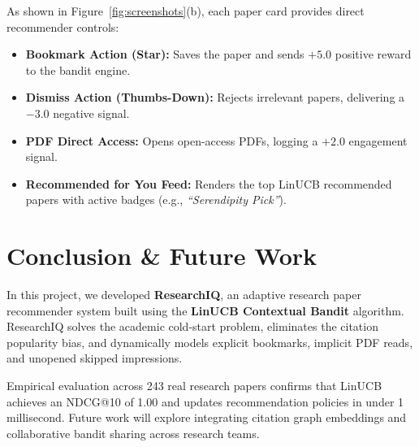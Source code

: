 \documentclass[11pt,a4paper]{article}
\begin{document}
As shown in Figure~\ref{fig:screenshots}(b), each paper card provides direct recommender controls:
\begin{itemize}[leftmargin=1.5em]
    \item \textbf{Bookmark Action (Star):} Saves the paper and sends $+5.0$ positive reward to the bandit engine.
    \item \textbf{Dismiss Action (Thumbs-Down):} Rejects irrelevant papers, delivering a $-3.0$ negative signal.
    \item \textbf{PDF Direct Access:} Opens open-access PDFs, logging a $+2.0$ engagement signal.
    \item \textbf{Recommended for You Feed:} Renders the top LinUCB recommended papers with active badges (e.g., \textit{``Serendipity Pick''}).
\end{itemize}

\section{Conclusion \& Future Work}

In this project, we developed \textbf{ResearchIQ}, an adaptive research paper recommender system built using the \textbf{LinUCB Contextual Bandit} algorithm. ResearchIQ solves the academic cold-start problem, eliminates the citation popularity bias, and dynamically models explicit bookmarks, implicit PDF reads, and unopened skipped impressions.

Empirical evaluation across 243 real research papers confirms that LinUCB achieves an NDCG@10 of 1.00 and updates recommendation policies in under 1 millisecond. Future work will explore integrating citation graph embeddings and collaborative bandit sharing across research teams.
\end{document}
